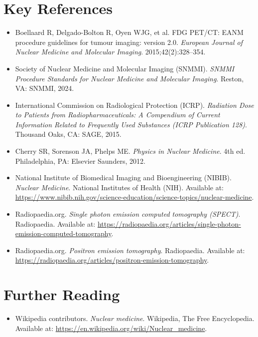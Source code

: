 \section{Key References}
\begin{itemize}
  \item Boellaard R, Delgado-Bolton R, Oyen WJG, et al. FDG PET/CT: EANM procedure guidelines for tumour imaging: version 2.0. \textit{European Journal of Nuclear Medicine and Molecular Imaging}. 2015;42(2):328--354.
  \item Society of Nuclear Medicine and Molecular Imaging (SNMMI). \textit{SNMMI Procedure Standards for Nuclear Medicine and Molecular Imaging}. Reston, VA: SNMMI, 2024.
  \item International Commission on Radiological Protection (ICRP). \textit{Radiation Dose to Patients from Radiopharmaceuticals: A Compendium of Current Information Related to Frequently Used Substances (ICRP Publication 128)}. Thousand Oaks, CA: SAGE, 2015.
  \item Cherry SR, Sorenson JA, Phelps ME. \textit{Physics in Nuclear Medicine}. 4th ed. Philadelphia, PA: Elsevier Saunders, 2012.
  \item National Institute of Biomedical Imaging and Bioengineering (NIBIB). \textit{Nuclear Medicine}. National Institutes of Health (NIH). Available at: \url{https://www.nibib.nih.gov/science-education/science-topics/nuclear-medicine}.
  \item Radiopaedia.org. \textit{Single photon emission computed tomography (SPECT)}. Radiopaedia. Available at: \url{https://radiopaedia.org/articles/single-photon-emission-computed-tomography}.
  \item Radiopaedia.org. \textit{Positron emission tomography}. Radiopaedia. Available at: \url{https://radiopaedia.org/articles/positron-emission-tomography}.
\end{itemize}

\section{Further Reading}
\begin{itemize}
  \item Wikipedia contributors. \textit{Nuclear medicine}. Wikipedia, The Free Encyclopedia. Available at: \url{https://en.wikipedia.org/wiki/Nuclear_medicine}.
\end{itemize}
